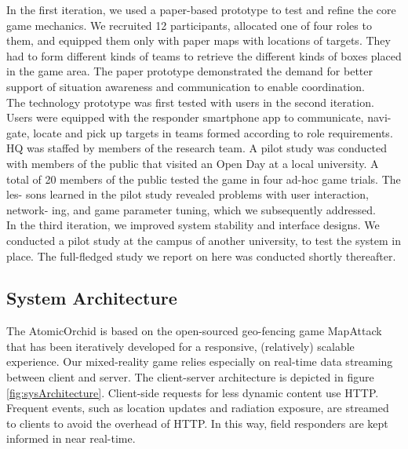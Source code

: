 In the first iteration, we used a paper-based prototype to test and refine the core game mechanics. We recruited 12 participants, allocated one of four roles to them, and equipped them only with paper maps with locations of targets. They had to form different kinds of teams to retrieve the different kinds of boxes placed in the game area. The paper prototype demonstrated the demand for better support of situation awareness and communication to enable coordination.\\

The technology prototype was first tested with users in the second iteration. Users were equipped with the responder smartphone app to communicate, navi- gate, locate and pick up targets in teams formed according to role requirements. HQ was staffed by members of the research team. A pilot study was conducted with members of the public that visited an Open Day at a local university. A total of 20 members of the public tested the game in four ad-hoc game trials. The les- sons learned in the pilot study revealed problems with user interaction, network- ing, and game parameter tuning, which we subsequently addressed.\\

In the third iteration, we improved system stability and interface designs. We conducted a pilot study at the campus of another university, to test the system in place. The full-fledged study we report on here was conducted shortly thereafter.\\

\subsection{System Architecture}
The AtomicOrchid is based on the open-sourced geo-fencing game MapAttack that has been iteratively developed for a responsive, (relatively) scalable experience. Our mixed-reality game relies especially on real-time data streaming between client and server. The client-server architecture is depicted in figure \ref{fig:sysArchitecture}. Client-side requests for less dynamic content use HTTP. Frequent events, such as location updates and radiation exposure, are streamed to clients to avoid the overhead of HTTP. In this way, field responders are kept informed in near real-time.\\

